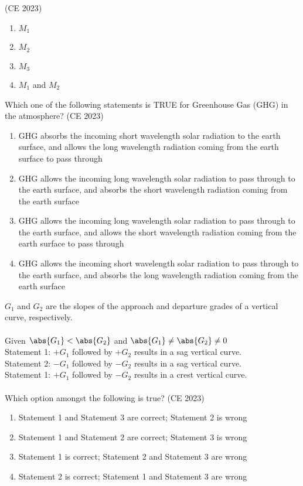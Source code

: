 \hfill{(CE 2023)}
\begin{enumerate}
\item $M_1$
\item $M_2$
\item $M_3$
\item $M_1$ and $M_2$
\end{enumerate}
\item Which one of the following statements is TRUE for Greenhouse Gas (GHG) in the
atmosphere?
\hfill{(CE 2023)}
\begin{enumerate}
\item GHG absorbs the incoming short wavelength solar radiation to the earth surface,
and allows the long wavelength radiation coming from the earth surface to pass
through
\item GHG allows the incoming long wavelength solar radiation to pass through to the
earth surface, and absorbs the short wavelength radiation coming from the earth
surface
\item GHG allows the incoming long wavelength solar radiation to pass through to the
earth surface, and allows the short wavelength radiation coming from the earth
surface to pass through
\item GHG allows the incoming short wavelength solar radiation to pass through to the
earth surface, and absorbs the long wavelength radiation coming from the earth
surface
\end{enumerate}
\item $G_1$ and $G_2$ are the slopes of the approach and departure grades of a vertical curve,
respectively.\\ \\
Given $\abs{G_1} < \abs{G_2}$ and $\abs{G_1} \neq \abs{G_2} \neq 0$\\
Statement 1: $+G_1$ followed by $+G_2$ results in a sag vertical curve.\\
Statement 2: $-G_1$ followed by $-G_2$ results in a sag vertical curve.\\
Statement 1: $+G_1$ followed by $-G_2$ results in a crest vertical curve.\\ \\
Which option amongst the following is true?
\hfill{(CE 2023)}
\begin{enumerate}
\item Statement 1 and Statement 3 are correct; Statement 2 is wrong
\item Statement 1 and Statement 2 are correct; Statement 3 is wrong
\item Statement 1 is correct; Statement 2 and Statement 3 are wrong
\item Statement 2 is correct; Statement 1 and Statement 3 are wrong
\end{enumerate}
